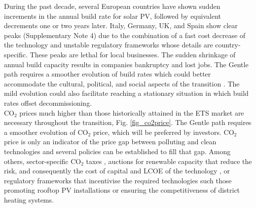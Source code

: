 \documentclass[5p]{elsarticle} %
\begin{document}
During the past decade, several European countries have shown sudden increments in the annual build rate for solar PV, followed by equivalent decrements one or two years later. Italy, Germany, UK, and Spain show clear peaks (Supplementary Note 4)  due to the combination of a fast cost decrease of the technology and unstable regulatory frameworks whose details are country-specific. These peaks are lethal for local businesses. The sudden shrinkage of annual build capacity results in companies bankruptcy and lost jobs. The Gentle path requires a smoother evolution of build rates which could better accommodate the cultural, political, and social aspects of the transition \cite{Geels_2017}. The mild evolution could also facilitate reaching a stationary situation in which build rates offset decommissioning. \\ 

CO$_2$ prices much higher than those historically attained in the ETS market are necessary throughout the transition, Fig. \ref{fig_co2price}. The Gentle path requires a smoother evolution of CO$_2$ price, which will be preferred by investors. CO$_2$ price is only an indicator of the price gap between polluting and clean technologies and several policies can be established to fill that gap. Among others, sector-specific CO$_2$ taxes \cite{Carbon_pricing_2019}, auctions for renewable capacity that reduce the risk, and consequently the cost of capital and LCOE of the technology \cite{Vartiainen_2019}, or regulatory frameworks that incentivise the required technologies such those promoting rooftop PV installations or ensuring the competitiveness of district heating systems. %
\end{document}
